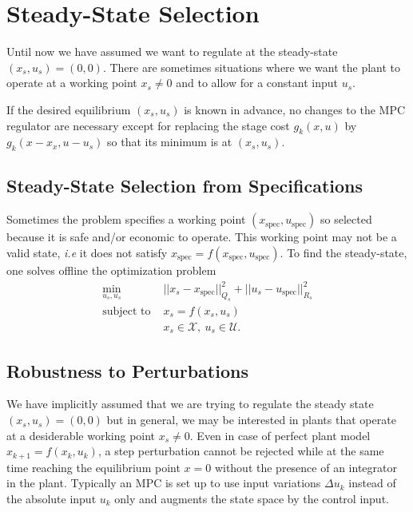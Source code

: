 \documentclass[11pt]{report}
\begin{document}
\section{Steady-State Selection}
\label{sec:steady-state-selection}

Until now we have assumed we want to regulate at the steady-state $(x_s,u_s) = (0,0)$. There are sometimes situations where we want the plant to operate at a working point $x_s\neq 0$ and to allow for a constant input $u_s$.

If the desired equilibrium $(x_s, u_s)$ is known in advance, no changes to the MPC regulator are necessary except for replacing the stage cost $g_k(x,u)$ by $g_k(x-x_x,u-u_s)$ so that its minimum is at $(x_s,u_s)$.

\subsection{Steady-State Selection from Specifications}
\label{sec:steady-state-from-specs}

Sometimes the problem specifies a working point $(x_\text{spec},u_\text{spec})$ so selected because it is safe and/or economic to operate. This working point may not be a valid state, \textit{i.e} it does not satisfy $x_\text{spec} = f(x_\text{spec},u_\text{spec})$. To find the steady-state, one solves offline the optimization problem
\begin{align*}
  \min_{u_s,u_s} & ||x_s-x_\text{spec}||_{Q_s}^2 + ||u_s-u_\text{spec}||_{R_s}^2 \\
  \text{subject to } & x_s = f(x_s,u_s) \\
                 & x_s \in \mathcal{X},\ u_s \in \mathcal{U}.
\end{align*}


\subsection{Robustness to Perturbations}
\label{sec:robustness-to-perturbations}

We have implicitly assumed that we are trying to regulate the steady state $(x_s,u_s) = (0,0)$ but in general, we may be interested in plants that operate at a desiderable working point $x_s\neq 0$. Even in case of perfect plant model $x_{k+1} = f(x_k,u_k)$, a step perturbation cannot be rejected while at the same time reaching the equilibrium point $x=0$ without the presence of an integrator in the plant. Typically an MPC is set up to use input variations $\Delta u_k$ instead of the absolute input $u_k$ only and augments the state space by the control input.
\end{document}
